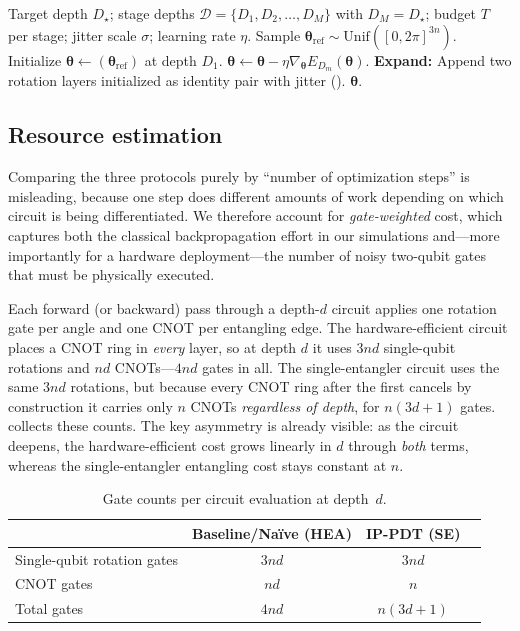 \documentclass[11pt]{article}
\theoremstyle{plain}
\theoremstyle{plain}
\begin{document}
\begin{algorithm}[t]
\caption{Identity-Paired Progressive Depth Training
(IP-PDT)}\label{alg:ippdt}
\begin{algorithmic}[1]
\Require Target depth $D_\star$; stage depths
  $\mathcal{D}=\{D_1,D_2,\ldots,D_M\}$ with $D_M=D_\star$;
  budget $T$ per stage; jitter scale $\sigma$; learning rate $\eta$.
\State Sample $\bm\theta_{\mathrm{ref}}\sim
  \mathrm{Unif}([0,2\pi]^{3n})$.
\State Initialize $\bm\theta\gets(\bm\theta_{\mathrm{ref}})$
  at depth $D_1$.
    \State $\bm\theta\gets\bm\theta
      -\eta \nabla_{\bm\theta}E_{D_m}(\bm\theta)$.
  \EndFor
    \State \textbf{Expand:} Append two rotation layers initialized as
      identity pair with jitter ().
  \EndIf
\EndFor
\State\Return $\bm\theta$.
\end{algorithmic}
\end{algorithm}
\subsection{Resource estimation}\label{sec:resource}
Comparing the three protocols purely by ``number of optimization steps''
is misleading, because one step does different amounts of work
depending on which circuit is being differentiated.  We therefore
account for \emph{gate-weighted} cost, which captures both the classical
backpropagation effort in our simulations and---more importantly for a
hardware deployment---the number of noisy two-qubit gates that must be
physically executed.

Each forward (or backward) pass through a depth-$d$ circuit applies one
rotation gate per angle and one CNOT per entangling edge.  The
hardware-efficient circuit places a CNOT ring in \emph{every} layer, so
at depth $d$ it uses $3nd$ single-qubit rotations and $nd$ CNOTs---$4nd$
gates in all.  The single-entangler circuit uses the same $3nd$
rotations, but because every CNOT ring after the first cancels by
construction it carries only $n$ CNOTs \emph{regardless of depth}, for
$n(3d+1)$ gates.   collects these counts.  The key
asymmetry is already visible: as the circuit deepens, the
hardware-efficient cost grows linearly in $d$ through \emph{both} terms,
whereas the single-entangler entangling cost stays constant at $n$.
\begin{table}[h]
\centering\small
\caption{Gate counts per circuit evaluation at depth~$d$.}
\label{tab:gate_counts}
\begin{tabular}{lccc}
\toprule
& \textbf{Baseline/Na\"ive} (HEA) & \textbf{IP-PDT} (SE) \\
\midrule
Single-qubit rotation gates & $3nd$ & $3nd$ \\
CNOT gates                  & $nd$  & $n$   \\
Total gates                 & $4nd$ & $n(3d+1)$ \\
\bottomrule
\end{tabular}
\end{table}
\end{document}

